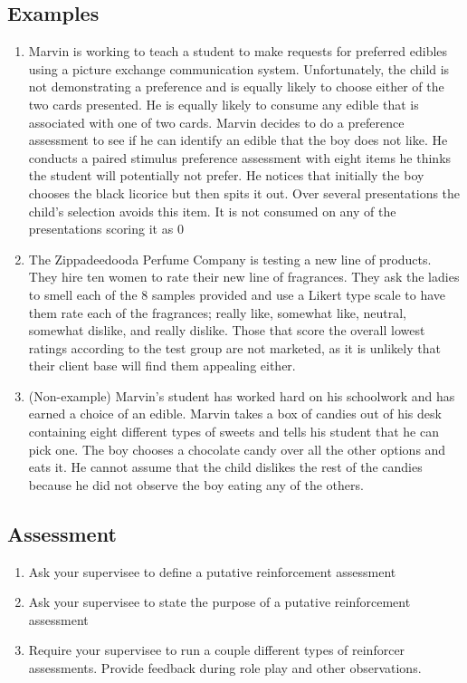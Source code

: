 \subsection{Examples}
\begin{enumerate}
\item Marvin is working to teach a student to make requests for preferred edibles using a picture exchange communication system.  Unfortunately, the child is not demonstrating a preference and is equally likely to choose either of the two cards presented.  He is equally likely to consume any edible that is associated with one of two cards.  Marvin decides to do a preference assessment to see if he can identify an edible that the boy does not like.  He conducts a paired stimulus preference assessment with eight items he thinks the student will potentially not prefer.   He notices that initially the boy chooses the black licorice but then spits it out.  Over several presentations the child's selection avoids this item.  It is not consumed on any of the presentations scoring it as 0%
\item The Zippadeedooda Perfume Company is testing a new line of products.  They hire ten women to rate their new line of fragrances.  They ask the ladies to smell each of the 8 samples provided and use a Likert type scale to have them rate each of the fragrances; really like, somewhat like, neutral, somewhat dislike, and really dislike.  Those that score the overall lowest ratings according to the test group are not marketed, as it is unlikely that their client base will find them appealing either.  
\item (Non-example) Marvin's student has worked hard on his schoolwork and has earned a choice of an edible.  Marvin takes a box of candies out of his desk containing eight different types of sweets and tells his student that he can pick one.  The boy chooses a chocolate candy over all the other options and eats it.  He cannot assume that the child dislikes the rest of the candies because he did not observe the boy eating any of the others.  
\end{enumerate}
%
\subsection{Assessment}
\begin{enumerate}
\item Ask your supervisee to define a putative reinforcement assessment
\item Ask your supervisee to state the purpose of a putative reinforcement assessment
\item Require your supervisee to run a couple different types of reinforcer assessments. Provide feedback during role play and other observations.
%
\end{enumerate}
%
